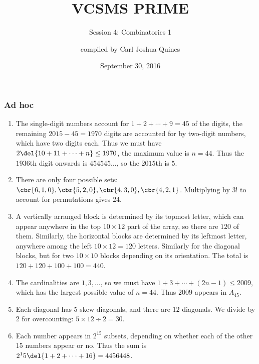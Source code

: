 \documentclass[10pt,paper=letter]{scrartcl}
\begin{document}
\title{VCSMS PRIME}
\subtitle{Session 4: Combinatorics 1}
\author{compiled by Carl Joshua Quines}
\date{September 30, 2016}

\maketitle

\subsubsection*{Ad hoc}

\begin{enumerate}

\item The single-digit numbers account for $1 + 2 + \cdots + 9 = 45$ of the digits, the remaining $2015 - 45 = 1970$ digits are accounted for by two-digit numbers, which have two digits each. Thus we must have $2\del{10 + 11 + \cdots + n} \leq 1970$, the maximum value is $n = 44$. Thus the $1936$th digit onwards is $454545\ldots$, so the $2015$th is $5$.

\item There are only four possible sets: $\cbr{6, 1, 0}, \cbr{5, 2, 0}, \cbr{4, 3, 0}, \cbr{4, 2, 1}$. Multiplying by $3!$ to account for permutations gives $24$.

\item A vertically arranged block is determined by its topmost letter, which can appear anywhere in the top $10 \times 12$ part of the array, so there are $120$ of them. Similarly, the horizontal blocks are determined by its leftmost letter, anywhere among the left $10 \times 12 = 120$ letters. Similarly for the diagonal blocks, but for two $10 \times 10$ blocks depending on its orientation. The total is $120 + 120 + 100 + 100 = 440$.

\item The cardinalities are $1, 3, \ldots$, so we must have $1 + 3 + \cdots + (2n - 1) \leq 2009$, which has the largest possible value of $n = 44$. Thus $2009$ appears in $A_{45}$.

\item Each diagonal has $5$ skew diagonals, and there are $12$ diagonals. We divide by $2$ for overcounting: $5 \times 12 \div 2 = 30$.

\item Each number appears in $2^15$ subsets, depending on whether each of the other $15$ numbers appear or no. Thus the sum is $2^15 \del{1 + 2 + \cdots + 16} = 4456448$.


\end{enumerate}
\end{document}
